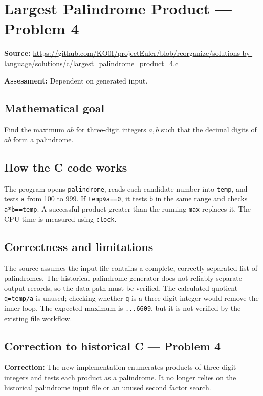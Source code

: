\section{Largest Palindrome Product --- Problem 4}
\label{prob:4}
\noindent\textbf{Source:} \url{https://github.com/KO0I/projectEuler/blob/reorganize/solutions-by-language/solutions/c/largest_palindrome_product_4.c}

\noindent\textbf{Assessment:} Dependent on generated input.

\subsection*{Mathematical goal}
Find the maximum \(ab\) for three-digit integers \(a,b\) such that the decimal digits of \(ab\) form a palindrome.

\subsection*{How the C code works}
The program opens \verb|palindrome|, reads each candidate number into \verb|temp|, and tests \verb|a| from 100 to 999. If \verb|temp%a==0|, it tests \verb|b| in the same range and checks \verb|a*b==temp|. A successful product greater than the running \verb|max| replaces it. The CPU time is measured using \verb|clock|.

\subsection*{Correctness and limitations}
The source assumes the input file contains a complete, correctly separated list of palindromes. The historical palindrome generator does not reliably separate output records, so the data path must be verified. The calculated quotient \verb|q=temp/a| is unused; checking whether \verb|q| is a three-digit integer would remove the inner loop. The expected maximum is \texttt{...6609}, but it is not verified by the existing file workflow.


\subsection*{Correction to historical C --- Problem 4}
{\color{red}\textbf{Correction:} The new implementation enumerates products of three-digit integers and tests each product as a palindrome. It no longer relies on the historical palindrome input file or an unused second factor search.}
